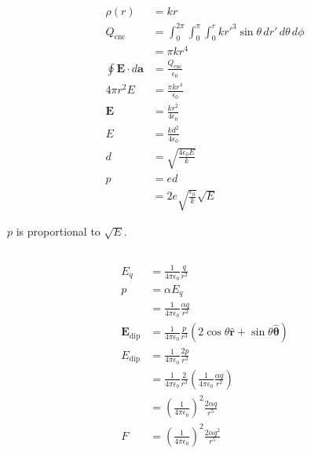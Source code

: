 \documentclass{article}
\renewcommand{\vec}[1]{\boldsymbol{\mathbf{#1}}}
\newcommand{\uvec}[1]{\hat{\vec{#1}}}
\newcommand{\ke}{\frac{1}{4 \pi \epsilon_0}}
\begin{document}
\begin{align*}
  \rho(r)                       & = k r                                                                              \\
  Q_\text{enc}                  & = \int_0^{2 \pi} \int_0^\pi \int_0^r k r'^3 \sin \theta \,d r' \,d \theta \,d \phi \\
                                & = \pi k r^4                                                                        \\
  \oint \vec{E} \cdot d \vec{a} & = \frac{Q_\text{enc}}{\epsilon_0}                                                  \\
  4 \pi r^2 E                   & = \frac{\pi k r^4}{\epsilon_0}                                                     \\
  \vec{E}                       & = \frac{k r^2}{4 \epsilon_0}                                                       \\
  E                             & = \frac{k d^2}{4 \epsilon_0}                                                       \\
  d                             & = \sqrt{\frac{4 \epsilon_0 E}{k}}                                                  \\
  p                             & = e d                                                                              \\
                                & = 2 e \sqrt{\frac{\epsilon_0}{k}} \sqrt{E}
\end{align*}

$p$ is proportional to $\sqrt{E}$.

\subsection{}

\begin{align*}
  E_q                & = \ke \frac{q}{r^2}                                                      \\
  p                  & = \alpha E_q                                                             \\
                     & = \ke \frac{\alpha q}{r^2}                                               \\
  \vec{E}_\text{dip} & = \ke \frac{p}{r^3} (2 \cos \theta \uvec{r} + \sin \theta \uvec{\theta}) \\
  E_\text{dip}       & = \ke \frac{2 p}{r^3}                                                    \\
                     & = \ke \frac{2}{r^3} \left( \ke \frac{\alpha q}{r^2} \right)              \\
                     & = \left( \ke \right)^2 \frac{2 \alpha q}{r^5}                            \\
  F                  & = \left( \ke \right)^2 \frac{2 \alpha q^2}{r^5}                          \\
\end{align*}
\end{document}
